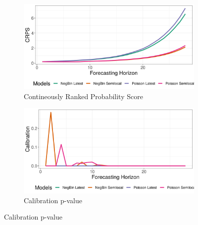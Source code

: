 \begin{figure}[H]
\begin{subfigure}{0.5\textwidth}
  \centering
  \includegraphics[width=\linewidth]{../output/Musienene_crps.png}  
  \caption{Contineously Ranked Probability Score}
  \label{Musienene_scores_1}
\end{subfigure}
\begin{subfigure}{0.5\textwidth}
  \centering
  \includegraphics[width=\linewidth]{../output/Musienene_calibration.png}  
  \caption{Calibration p-value}
  \label{Musienene_scores_2}
\end{subfigure}


\end{figure}
